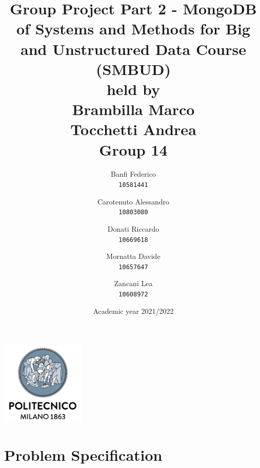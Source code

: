 \documentclass[a4paper,12pt]{article}
\begin{document}
\title{%
  Group Project Part 2 - MongoDB \\
  \large of Systems and Methods for Big
    and Unstructured Data Course \\(SMBUD)\\
    held by\\ Brambilla Marco\\ Tocchetti Andrea \\
  \vspace{5mm}
  \Large \textbf{Group 14}}
\author{Banfi Federico\\
  \texttt{10581441}
  \and
  Carotenuto Alessandro\\
  \texttt{10803080}
  \and
  Donati Riccardo\\
  \texttt{10669618}
  \and
  Mornatta Davide\\
  \texttt{10657647}
  \and
  Zancani Lea\\
  \texttt{10608972}}
\date{Academic year 2021/2022}
\maketitle
\begin{center}
  \includegraphics[width=4cm]{polilogo.png}\\
\end{center}
\newpage
\tableofcontents
\newpage
\section{Problem Specification}
\end{document}
